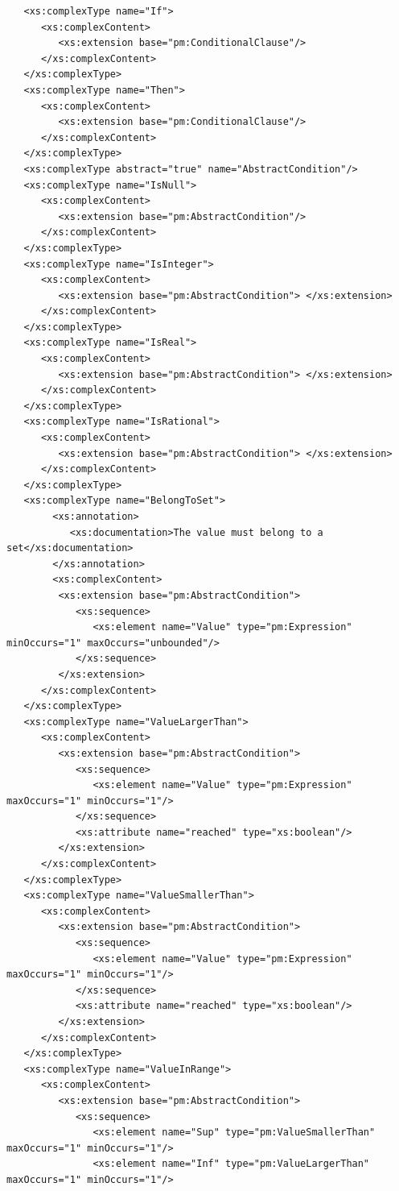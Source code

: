 \documentclass[a4paper,11pt] {ivoa}
\begin{document}
\begin{lstlisting}
   <xs:complexType name="If">
      <xs:complexContent>
         <xs:extension base="pm:ConditionalClause"/>
      </xs:complexContent>
   </xs:complexType>
   <xs:complexType name="Then">
      <xs:complexContent>
         <xs:extension base="pm:ConditionalClause"/>
      </xs:complexContent>
   </xs:complexType>
   <xs:complexType abstract="true" name="AbstractCondition"/>
   <xs:complexType name="IsNull">
      <xs:complexContent>
         <xs:extension base="pm:AbstractCondition"/>
      </xs:complexContent>
   </xs:complexType>
   <xs:complexType name="IsInteger">
      <xs:complexContent>
         <xs:extension base="pm:AbstractCondition"> </xs:extension>
      </xs:complexContent>
   </xs:complexType>
   <xs:complexType name="IsReal">
      <xs:complexContent>
         <xs:extension base="pm:AbstractCondition"> </xs:extension>
      </xs:complexContent>
   </xs:complexType>
   <xs:complexType name="IsRational">
      <xs:complexContent>
         <xs:extension base="pm:AbstractCondition"> </xs:extension>
      </xs:complexContent>
   </xs:complexType>
   <xs:complexType name="BelongToSet">
        <xs:annotation>
           <xs:documentation>The value must belong to a set</xs:documentation>
        </xs:annotation>
        <xs:complexContent>
         <xs:extension base="pm:AbstractCondition">
            <xs:sequence>
               <xs:element name="Value" type="pm:Expression" minOccurs="1" maxOccurs="unbounded"/>
            </xs:sequence>
         </xs:extension>
      </xs:complexContent>
   </xs:complexType>
   <xs:complexType name="ValueLargerThan">
      <xs:complexContent>
         <xs:extension base="pm:AbstractCondition">
            <xs:sequence>
               <xs:element name="Value" type="pm:Expression" maxOccurs="1" minOccurs="1"/>
            </xs:sequence>
            <xs:attribute name="reached" type="xs:boolean"/>
         </xs:extension>
      </xs:complexContent>
   </xs:complexType>
   <xs:complexType name="ValueSmallerThan">
      <xs:complexContent>
         <xs:extension base="pm:AbstractCondition">
            <xs:sequence>
               <xs:element name="Value" type="pm:Expression" maxOccurs="1" minOccurs="1"/>
            </xs:sequence>
            <xs:attribute name="reached" type="xs:boolean"/>
         </xs:extension>
      </xs:complexContent>
   </xs:complexType>
   <xs:complexType name="ValueInRange">
      <xs:complexContent>
         <xs:extension base="pm:AbstractCondition">
            <xs:sequence>
               <xs:element name="Sup" type="pm:ValueSmallerThan" maxOccurs="1" minOccurs="1"/>
               <xs:element name="Inf" type="pm:ValueLargerThan" maxOccurs="1" minOccurs="1"/>

\end{lstlisting}
\end{document}

